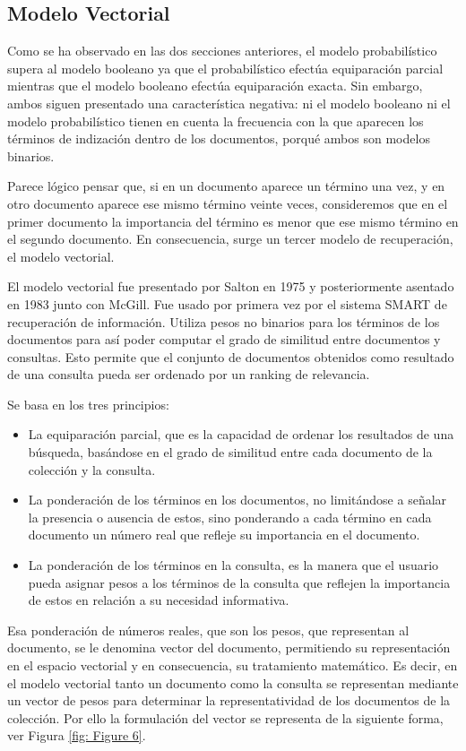 \documentclass[titlepage]{article}
\begin{document}
\subsection{Modelo Vectorial}

Como se ha observado en las dos secciones anteriores, el modelo probabilístico supera al modelo booleano ya que el probabilístico efectúa equiparación parcial mientras que el modelo booleano efectúa equiparación exacta. Sin embargo, ambos siguen presentado una característica negativa: ni el modelo booleano ni el modelo probabilístico tienen en cuenta la frecuencia con la que aparecen los términos de indización dentro de los documentos, porqué ambos son modelos binarios.

Parece lógico pensar que, si en un documento aparece un término una vez, y en otro documento aparece ese mismo término veinte veces, consideremos que en el primer documento la importancia del término es menor que ese mismo término en el segundo documento. En consecuencia, surge un tercer modelo de recuperación, el modelo vectorial.

El modelo vectorial fue presentado por Salton en 1975 y posteriormente asentado en 1983 junto con McGill. Fue usado por primera vez por el sistema SMART de recuperación de información. Utiliza pesos no binarios para los términos de los documentos para así poder computar el grado de similitud entre documentos y consultas.  Esto permite que el conjunto de documentos obtenidos como resultado de una consulta pueda ser ordenado por un ranking de relevancia. 

Se basa en los tres principios:

\begin{itemize}
	\item La equiparación parcial, que es la capacidad de ordenar los resultados de una búsqueda, basándose en el grado de similitud entre cada documento de la colección y la consulta.
	\item La ponderación de los términos en los documentos, no limitándose a señalar la presencia o ausencia de estos, sino ponderando a cada término en cada documento un número real que refleje su importancia en el documento.
	\item La ponderación de los términos en la consulta, es la manera que el usuario pueda asignar pesos a los términos de la consulta que reflejen la importancia de estos en relación a su necesidad informativa.
\end{itemize}

Esa ponderación de números reales, que son los pesos, que representan al documento, se le denomina vector del documento, permitiendo su representación en el espacio vectorial y en consecuencia, su tratamiento matemático. Es decir, en el modelo vectorial tanto un documento como la consulta se representan mediante un vector de pesos para determinar la representatividad de los documentos de la colección. Por ello la formulación del vector se representa de la siguiente forma, ver Figura \ref{fig: Figure 6}.
\end{document}
